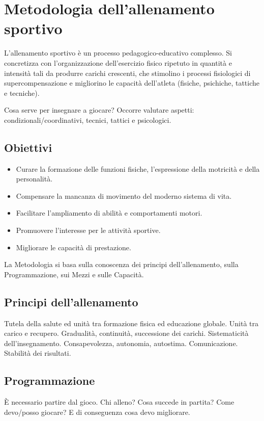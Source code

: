 \chapter{Metodologia dell'allenamento sportivo}

L'allenamento sportivo è un processo pedagogico-educativo complesso. Si concretizza con l'organizzazione dell'esercizio fisico ripetuto in quantità e intensità tali da produrre carichi crescenti, che stimolino i processi fisiologici di supercompensazione e migliorino le capacità dell'atleta (fisiche, psichiche, tattiche e tecniche).

Cosa serve per insegnare a giocare?
Occorre valutare aspetti: condizionali/coordinativi, tecnici, tattici e psicologici.

\section{Obiettivi}
\begin{itemize}
\item Curare la formazione delle funzioni fisiche, l'espressione della motricità e della personalità.
\item Compensare la mancanza di movimento del moderno sistema di vita.
\item Facilitare l'ampliamento di abilità e comportamenti motori.
\item Promuovere l'interesse per le attività sportive.
\item Migliorare le capacità di prestazione.
\end{itemize}

La Metodologia si basa sulla conoscenza dei principi dell'allenamento, sulla Programmazione, sui Mezzi e sulle Capacità.

\section{Principi dell'allenamento}
Tutela della salute ed unità tra formazione fisica ed educazione globale.
Unità tra carico e recupero.
Gradualità, continuità, successione dei carichi.
Sistematicità dell'insegnamento.
Consapevolezza, autonomia, autostima.
Comunicazione.
Stabilità dei risultati.


\section{Programmazione}
\`E necessario partire dal gioco. Chi alleno? Cosa succede in partita? Come devo/posso giocare? E di conseguenza cosa devo migliorare.

